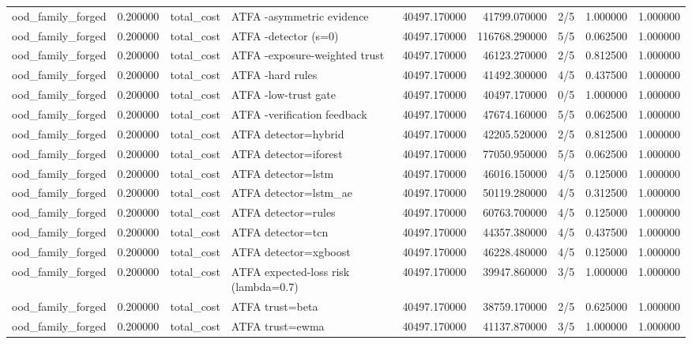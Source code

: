 \begin{tabular}{lrllrrlrr}
ood\_family\_forged & 0.200000 & total\_cost & ATFA -asymmetric evidence & 40497.170000 & 41799.070000 & 2/5 & 1.000000 & 1.000000 \\
ood\_family\_forged & 0.200000 & total\_cost & ATFA -detector (s=0) & 40497.170000 & 116768.290000 & 5/5 & 0.062500 & 1.000000 \\
ood\_family\_forged & 0.200000 & total\_cost & ATFA -exposure-weighted trust & 40497.170000 & 46123.270000 & 2/5 & 0.812500 & 1.000000 \\
ood\_family\_forged & 0.200000 & total\_cost & ATFA -hard rules & 40497.170000 & 41492.300000 & 4/5 & 0.437500 & 1.000000 \\
ood\_family\_forged & 0.200000 & total\_cost & ATFA -low-trust gate & 40497.170000 & 40497.170000 & 0/5 & 1.000000 & 1.000000 \\
ood\_family\_forged & 0.200000 & total\_cost & ATFA -verification feedback & 40497.170000 & 47674.160000 & 5/5 & 0.062500 & 1.000000 \\
ood\_family\_forged & 0.200000 & total\_cost & ATFA detector=hybrid & 40497.170000 & 42205.520000 & 2/5 & 0.812500 & 1.000000 \\
ood\_family\_forged & 0.200000 & total\_cost & ATFA detector=iforest & 40497.170000 & 77050.950000 & 5/5 & 0.062500 & 1.000000 \\
ood\_family\_forged & 0.200000 & total\_cost & ATFA detector=lstm & 40497.170000 & 46016.150000 & 4/5 & 0.125000 & 1.000000 \\
ood\_family\_forged & 0.200000 & total\_cost & ATFA detector=lstm\_ae & 40497.170000 & 50119.280000 & 4/5 & 0.312500 & 1.000000 \\
ood\_family\_forged & 0.200000 & total\_cost & ATFA detector=rules & 40497.170000 & 60763.700000 & 4/5 & 0.125000 & 1.000000 \\
ood\_family\_forged & 0.200000 & total\_cost & ATFA detector=tcn & 40497.170000 & 44357.380000 & 4/5 & 0.437500 & 1.000000 \\
ood\_family\_forged & 0.200000 & total\_cost & ATFA detector=xgboost & 40497.170000 & 46228.480000 & 4/5 & 0.125000 & 1.000000 \\
ood\_family\_forged & 0.200000 & total\_cost & ATFA expected-loss risk (lambda=0.7) & 40497.170000 & 39947.860000 & 3/5 & 1.000000 & 1.000000 \\
ood\_family\_forged & 0.200000 & total\_cost & ATFA trust=beta & 40497.170000 & 38759.170000 & 2/5 & 0.625000 & 1.000000 \\
ood\_family\_forged & 0.200000 & total\_cost & ATFA trust=ewma & 40497.170000 & 41137.870000 & 3/5 & 1.000000 & 1.000000 \\

\end{tabular}
